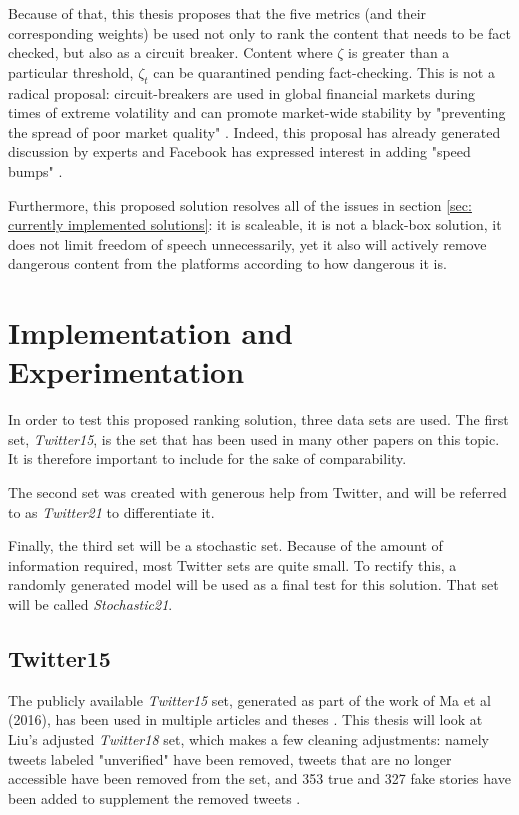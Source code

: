 \documentclass[preprint,review,12pt]{elsarticle}
\begin{document}
Because of that, this thesis proposes that the five metrics (and their corresponding weights) be used not only to rank the content that needs to be fact checked, but also as a circuit breaker. Content where $\zeta$ is greater than a particular threshold, $\zeta_t$ can be quarantined pending fact-checking. This is not a radical proposal: circuit-breakers are used in global financial markets during times of extreme volatility \cite{wang2019microstructure,schwert1990stock} and can promote market-wide stability by "preventing the spread of poor market quality" \cite{brugler2014single,schneider2020stock}. Indeed, this proposal has already generated discussion by experts \cite{goodman2020digital,simpson2020fighting} and Facebook has expressed interest in adding "speed bumps" \cite{bond2020circuit}.

Furthermore, this proposed solution resolves all of the issues in section \ref{sec: currently implemented solutions}: it is scaleable, it is not a black-box solution, it does not limit freedom of speech unnecessarily, yet it also will actively remove dangerous content from the platforms according to how dangerous it is.

\section{Implementation and Experimentation}
In order to test this proposed ranking solution, three data sets are used. The first set, \textit{Twitter15}, is the set that has been used in many other papers on this topic. It is therefore important to include for the sake of comparability.

The second set was created with generous help from Twitter, and will be referred to as \textit{Twitter21} to differentiate it. 

Finally, the third set will be a stochastic set. Because of the amount of information required, most Twitter sets are quite small. To rectify this, a randomly generated model will be used as a final test for this solution. That set will be called \textit{Stochastic21}.


\subsection{Twitter15}
 The publicly available \textit{Twitter15} set, generated as part of the work of Ma et al (2016), has been used in multiple articles and theses \citep{liu2018early,ma2017detect,ma2016detecting,khoo2020interpretable,liu2019early,huang2019deep}. This thesis will look at Liu's adjusted \textit{Twitter18} set, which makes a few cleaning adjustments: namely tweets labeled "unverified" have been removed, tweets that are no longer accessible have been removed from the set, and 353 true and 327 fake stories have been added to supplement the removed tweets \citep{liu2019early}. 
 
\end{document}
